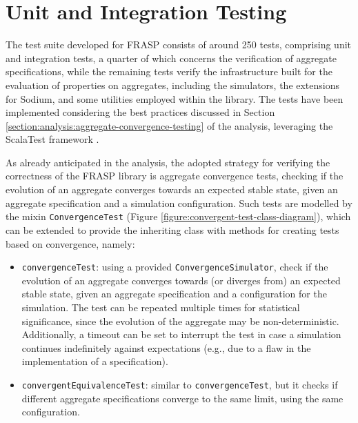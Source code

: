 
\section{Unit and Integration Testing}
\label{section:verification:unit-and-integration-testing}

The test suite developed for FRASP consists of around 250 tests, comprising
unit and integration tests, a quarter of which concerns the verification of
aggregate specifications, while the remaining tests verify the infrastructure
built for the evaluation of properties on aggregates, including the simulators,
the extensions for Sodium, and some utilities employed within the library. The
tests have been implemented considering the best practices discussed in Section
\ref{section:analysis:aggregate-convergence-testing} of the analysis,
leveraging the ScalaTest framework \cite{ScalaTest}.

As already anticipated in the analysis, the adopted strategy for verifying the
correctness of the FRASP library is aggregate convergence tests, checking if
the evolution of an aggregate converges towards an expected stable state, given
an aggregate specification and a simulation configuration. Such tests are
modelled by the mixin \texttt{ConvergenceTest} (Figure
\ref{figure:convergent-test-class-diagram}), which can be extended to provide
the inheriting class with methods for creating tests based on convergence,
namely:
\begin{itemize}
  \item \texttt{convergenceTest}: using a provided
        \texttt{ConvergenceSimulator}, check if the evolution of an aggregate
        converges towards (or diverges from) an expected stable state, given an
        aggregate specification and a configuration for the simulation. The
        test can be repeated multiple times for statistical significance, since
        the evolution of the aggregate may be non-deterministic. Additionally,
        a timeout can be set to interrupt the test in case a simulation
        continues indefinitely against expectations (e.g., due to a flaw in the
        implementation of a specification).
  \item \texttt{convergentEquivalenceTest}: similar to
        \texttt{convergenceTest}, but it checks if different aggregate
        specifications converge to the same limit, using the same
        configuration.
\end{itemize}

